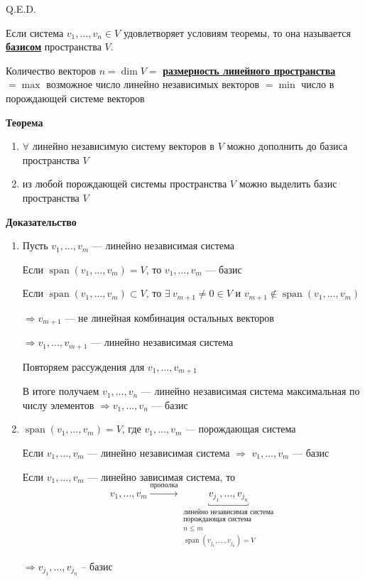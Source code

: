 \documentclass[twoside]{book}
\DeclareMathOperator{\spann}{span}
\newcommand{\deff}[1]{\underline{\textbf{#1}}}
\begin{document}
\hfill Q.E.D.

Если система \(v_1, \ldots, v_n \in V\) удовлетворяет условиям теоремы, то она называется \deff{базисом} пространства \(V\).

Количество векторов \(n = \dim V = \) \deff{размерность линейного пространства} \(= \max\) возможное число линейно независимых векторов \(= \min\) число в порождающей системе векторов

\textbf{Теорема}

\begin{enumerate}
    \item \(\forall\) линейно независимую систему векторов в \(V\) можно дополнить до базиса пространства \(V\)

    \item из любой порождающей системы пространства \(V\) можно выделить базис пространства \(V\)
\end{enumerate}

\textbf{Доказательство}

\begin{enumerate}
    \item Пусть \(v_1, \ldots, v_m\) --- линейно независимая система

          Если \(\spann (v_1, \ldots, v_m) = V\), то \(v_1, \ldots, v_m\) --- базис

          Если \(\spann (v_1, \ldots, v_m) \subset V\), то \(\exists \ v_{m + 1} \neq 0 \in V\) и \(v_{m + 1} \notin \spann (v_1, \ldots, v_m)\)

          \(\Rightarrow v_{m + 1}\) --- не линейная комбинация остальных векторов

          \(\Rightarrow v_1, \ldots, v_{m + 1}\) --- линейно независимая система

          Повторяем рассуждения для \(v_1, \ldots, v_{m + 1}\)

          В итоге получаем \(v_1, \ldots, v_n\) --- линейно независимая система максимальная по числу элементов \(\Rightarrow v_1, \ldots, v_n\) --- базис

    \item \(\spann (v_1, \ldots, v_m) = V\), где \(v_1, \ldots, v_m\) --- порождающая система

          Если \(v_1, \ldots, v_m\) --- линейно независимая система \(\Rightarrow\) \(v_1, \ldots, v_m\) --- базис

          Если \(v_1, \ldots, v_m\) --- линейно зависимая система, то
          \[
              v_1, \ldots, v_m \xrightarrow{\text{прополка}} \underbracket{v_{j_1}, \ldots, v_{j_n}}_{\substack{\text{линейно независимая система} \\ \text{порождающая система} \\ n \le m \\ \spann (v_{j_1}, \ldots, v_{j_n}) = V}}
          \]

          \(\Rightarrow v_{j_1}, \ldots, v_{j_n}\) -- базис
\end{enumerate}
\end{document}
